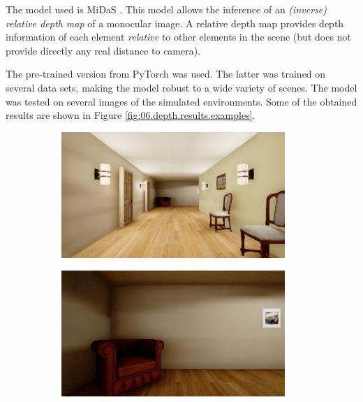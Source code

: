 The model used is MiDaS \cite{ranftl2019towards}. This model allows the inference of an \emph{(inverse) relative depth map} of a monocular image. A relative depth map provides depth information of each element \emph{relative} to other elements in the scene (but does not provide directly any real distance to camera).

The pre-trained version from PyTorch \cite{pytorch2021midas} was used. The latter was trained on several data sets, making the model robust to a wide variety of scenes. The model was tested on several images of the simulated environments. Some of the obtained results are shown in Figure \ref{fig:06.depth.results.examples}.

\begin{figure}[H]
    \centering
    \begin{subfigure}{0.32\textwidth}
        \centering
        \includegraphics[width=\textwidth]{resources/png/06/depth/original/0.png}
        \vspace{0.5em}
    \end{subfigure}
    \hfill
    \begin{subfigure}{0.32\textwidth}
        \centering
        \includegraphics[width=\textwidth]{resources/png/06/depth/original/1.png}

\end{subfigure}
\end{figure}
